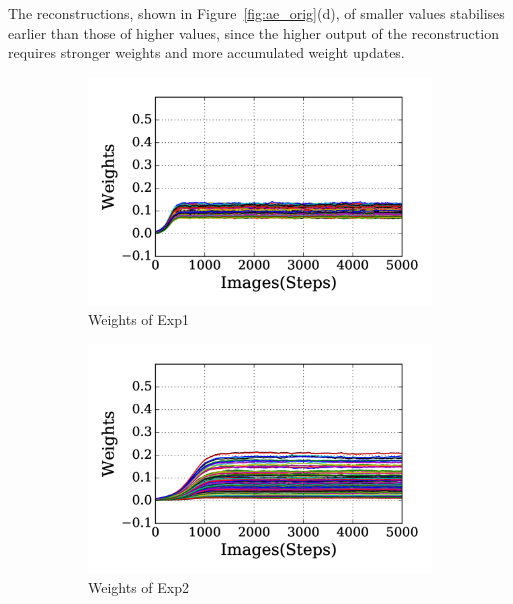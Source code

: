 The reconstructions, shown in Figure~\ref{fig:ae_orig}(d), of smaller values stabilises earlier than those of higher values, since the higher output of the reconstruction requires stronger weights and more accumulated weight updates. 
\begin{figure}
	\centering
	\begin{subfigure}[t]{0.48\textwidth}
		\includegraphics[width=\textwidth]{pics_sdlm/21_exp_AE_noise/exp1_weights_s.png}
		\caption{Weights of Exp1}
	\end{subfigure}
	\begin{subfigure}[t]{0.48\textwidth}
		\includegraphics[width=\textwidth]{pics_sdlm/21_exp_AE_noise/exp2_weights_s.png}
		\caption{Weights of Exp2}
	\end{subfigure}
	\begin{subfigure}[t]{0.48\textwidth}

\end{subfigure}
\end{figure}
